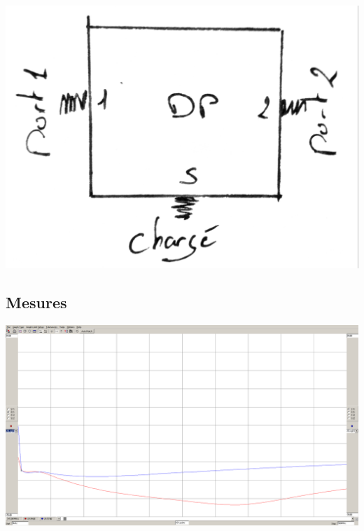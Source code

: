 \documentclass[a4paper,12pt]{report}            %
\begin{document}
\begin{center}
	\includegraphics[scale = 0.15]{pic/DP12.png} \\\end{center}

\subsection{Mesures}
\begin{center}\includegraphics[scale = 0.25]{pic/Isolation_DP.png}\\ \end{center}
\end{document}
